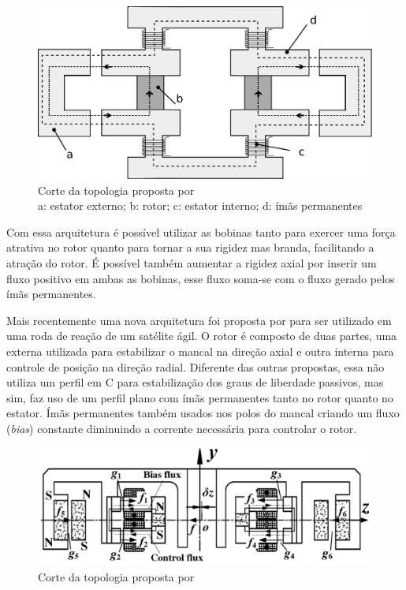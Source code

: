 
\begin{figure}[!ht]
	\centering
	\includegraphics[width=0.8\linewidth]{./Figs/mancais/alemao.pdf}
	\caption{Corte da topologia proposta por \cite{Scharfe2001} \\
	a: estator externo; b: rotor; c: estator interno; d: ímãs permanentes}
	\label{Fig:modelo:alemao}
\end{figure} 

Com essa arquitetura é possível utilizar as bobinas tanto para exercer uma força atrativa no rotor quanto para tornar a sua rigidez mas branda, facilitando a atração do rotor. É possível também aumentar a rigidez axial por inserir um fluxo positivo em ambas as bobinas, esse fluxo soma-se com o fluxo gerado pelos ímãs permanentes.

Mais recentemente uma nova arquitetura foi proposta por \citet{Bangcheng2012} para ser utilizado em uma roda de reação de um satélite ágil.  O rotor é composto de duas partes, uma externa utilizada para estabilizar o mancal na direção axial e outra interna para controle de posição na direção radial. Diferente das outras propostas, essa não utiliza um perfil em C para estabilização dos graus de liberdade passivos, mas sim, faz uso de um perfil plano com ímãs permanentes tanto no rotor quanto no estator.  Ímãs permanentes também usados nos polos do mancal criando um fluxo (\textit{bias}) constante diminuindo a corrente necessária para controlar o rotor.
 
\begin{figure}[!ht]
	\centering
	\includegraphics[width=1\linewidth]{./Figs/mancais/chines}
	\caption{Corte da topologia proposta por \cite{Bangcheng2012}}
	\label{Fig:modelo:chines}
\end{figure}

